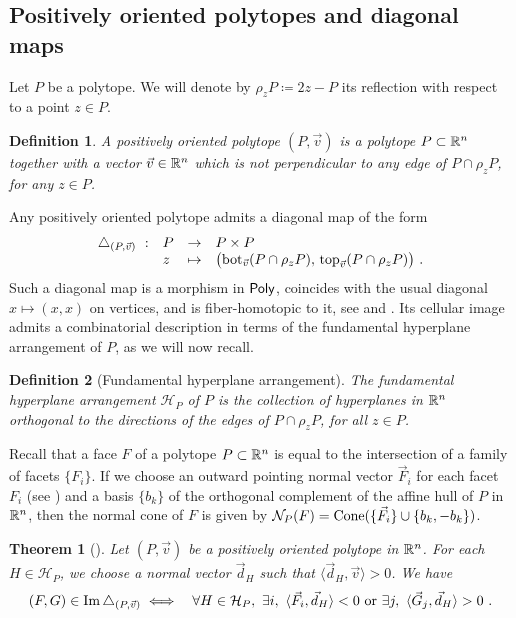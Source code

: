 \documentclass[twoside, 12pt]{amsart}
\newtheorem{definition}{Definition}[section]
\newtheorem{theorem}{Theorem}
\theoremstyle{remark}
\begin{document}
\subsection{Positively oriented polytopes and diagonal maps}

Let $P$ be a polytope.
We will denote by $\rho_z P \coloneqq 2z-P$ its reflection with respect to a point $z \in P$. 

\begin{definition}
A \emph{positively oriented polytope} $(P, \vec v)$ is a polytope $P \subset \mathbb{R}^n$ together with a vector $\vec v\in \mathbb{R}^n$ which is not perpendicular to any edge of $P\cap \rho_z P$, for any $z \in P$.
\end{definition}

Any positively oriented polytope admits a diagonal map of the form
\begin{align*}
\begin{array}{rlcl}
\triangle_{(P,\vec v)}\  : & P &\to  &P \times P\\
&z & \mapsto& 
\bigl(\operatorname{bot}_{\vec v}(P\cap \rho_zP),\,  \operatorname{top}_{\vec v}(P\cap \rho_z P)\bigr) \ .
\end{array}
\end{align*}
Such a diagonal map is a morphism in $\mathsf{Poly}$, coincides with the usual diagonal $x\mapsto (x, x)$ on vertices, and is fiber-homotopic to it, see \cite[Proposition~5]{MTTV19} and \cite[Proposition 1.1]{LA21}.
Its cellular image admits a combinatorial description in terms of the fundamental hyperplane arrangement of $P$, as we will now recall.

\begin{definition}[Fundamental hyperplane arrangement]
  \label{def:fundamentalhyperplane} 
  The \emph{fundamental hyperplane arrangement} $\mathcal{H}_P$ of $P$ is the collection of hyperplanes in $\mathbb{R}^n$ orthogonal to the directions of the edges of $P\cap\rho_z P$, for all $z \in P$. 
\end{definition}

Recall that a face $F$ of a polytope $P \subset \mathbb{R}^n$ is equal to the intersection of a family of facets $\{F_i\}$. 
If we choose an outward pointing normal vector $\vec F_i$ for each facet $F_i$ (see \cite[Definition 1.24]{LA21}) and a basis $\{b_k\}$ of the orthogonal complement of the affine hull of $P$ in $\mathbb{R}^n$, then the normal cone of $F$ is given by $\mathcal{N}_P(F)=\operatorname{Cone}(\{\vec F_i\} \cup \{b_k,-b_k\})$. 

\begin{theorem}[{\cite[Theorem 1.23]{LA21}}]
  \label{thm:universalformula} 
  Let $(P,\vec v)$ be a positively oriented polytope in $\mathbb{R}^n$. For each $H\in\mathcal{H}_P$, we choose a normal vector $\vec d_H$ such that $\langle \vec d_H, \vec v \rangle >0$. We have 
\begin{eqnarray*}
  (F,G) \in \operatorname{Im} \triangle_{(P,\vec v)} 
  &\iff&  \forall H \in \mathcal{H}_P , \ \exists i , \ \langle \vec F_i, \vec d_H \rangle < 0  \text{ or } \exists j , \ \langle \vec G_j, \vec d_H \rangle > 0 \ . 
\end{eqnarray*} 
\end{theorem}
\end{document}
